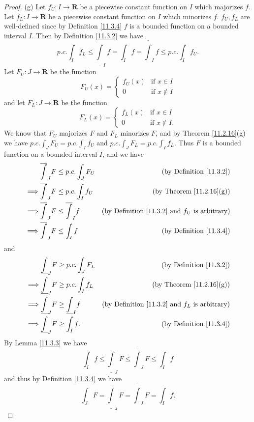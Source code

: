 \begin{proof}{(g)}
    Let \(f_U : I \to \mathbf{R}\) be a piecewise constant function on \(I\) which majorizes \(f\).
    Let \(f_L : I \to \mathbf{R}\) be a piecewise constant function on \(I\) which minorizes \(f\).
    \(f_U, f_L\) are well-defined since by Definition \ref{11.3.4} \(f\) is a bounded function on a bounded interval \(I\).
    Then by Definition \ref{11.3.2} we have
    \[
        p.c. \int_I f_L \leq \underline{\int}_I f = \int_I f = \overline{\int}_I f \leq p.c. \int_I f_U.
    \]
    Let \(F_U : J \to \mathbf{R}\) be the function
    \[
        F_U(x) = \begin{cases}
            f_U(x) & \text{if } x \in I    \\
            0      & \text{if } x \notin I
        \end{cases}
    \]
    and let \(F_L : J \to \mathbf{R}\) be the function
    \[
        F_L(x) = \begin{cases}
            f_L(x) & \text{if } x \in I     \\
            0      & \text{if } x \notin I.
        \end{cases}
    \]
    We know that \(F_U\) majorizes \(F\) and \(F_L\) minorizes \(F\), and by Theorem \ref{11.2.16}(g) we have \(p.c. \int_J F_U = p.c. \int_I f_U\) and \(p.c. \int_J F_L = p.c. \int_I f_L\).
    Thus \(F\) is a bounded function on a bounded interval \(I\), and we have
    \begin{align*}
                 & \overline{\int}_J F \leq p.c. \int_J F_U     & \text{(by Definition \ref{11.3.2})}                          \\
        \implies & \overline{\int}_J F \leq p.c. \int_I f_U     & \text{(by Theorem \ref{11.2.16}(g))}                         \\
        \implies & \overline{\int}_J F \leq \overline{\int}_I f & \text{(by Definition \ref{11.3.2} and \(f_U\) is arbitrary)} \\
        \implies & \overline{\int}_J F \leq \int_I f            & \text{(by Definition \ref{11.3.4})}
    \end{align*}
    and
    \begin{align*}
                 & \underline{\int}_J F \geq p.c. \int_J F_L      & \text{(by Definition \ref{11.3.2})}                          \\
        \implies & \underline{\int}_J F \geq p.c. \int_I f_L      & \text{(by Theorem \ref{11.2.16}(g))}                         \\
        \implies & \underline{\int}_J F \geq \underline{\int}_I f & \text{(by Definition \ref{11.3.2} and \(f_L\) is arbitrary)} \\
        \implies & \underline{\int}_J F \geq \int_I f.            & \text{(by Definition \ref{11.3.4})}
    \end{align*}
    By Lemma \ref{11.3.3} we have
    \[
        \int_I f \leq \underline{\int}_J F \leq \overline{\int}_J F \leq \int_I f
    \]
    and thus by Definition \ref{11.3.4} we have
    \[
        \int_J F = \underline{\int}_J F = \overline{\int}_J F = \int_I f.
    \]
\end{proof}

